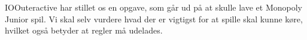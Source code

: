 IOOuteractive har stillet os en opgave, som går ud på at skulle lave et Monopoly Junior spil. Vi skal selv vurdere hvad der er vigtigst for at spille skal kunne køre, hvilket også betyder at regler må udelades. 
